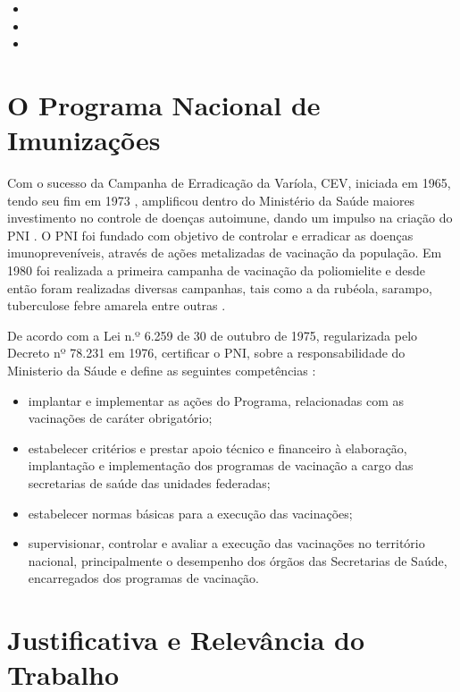 \begin{itemize}
  \item {}
  \item {}
  \item {}
\end{itemize}

\section{O Programa Nacional de Imunizações}
\label{intro:justificativa}

Com o sucesso da Campanha de Erradicação da Varíola, CEV, iniciada em 1965, tendo seu fim em 1973 \cite{muniz2011memorias}, amplificou dentro do Ministério da Saúde maiores investimento no controle de doenças autoimune, dando um impulso na criação do PNI \cite{temporao2003programa}. O PNI foi fundado com objetivo de controlar e erradicar as doenças imunopreveníveis, através de ações metalizadas de vacinação da população. Em 1980 foi realizada a primeira campanha de vacinação da poliomielite e desde então foram realizadas diversas campanhas, tais como a da rubéola, sarampo, tuberculose febre amarela entre outras \cite{temporao2003programa,ministerio2001manual}.

De acordo com a Lei n.º 6.259 de 30 de outubro de 1975, regularizada pelo Decreto nº 78.231 em 1976, certificar o PNI, sobre a responsabilidade do Ministerio da Sáude e define as seguintes competências \cite{ministerio2001manual}:
  \begin{itemize}
    \item implantar e implementar as ações do Programa, relacionadas com as vacinações de caráter obrigatório;
    \item  estabelecer critérios e prestar apoio técnico e financeiro à elaboração, implantação e implementação dos programas de vacinação a cargo das secretarias de saúde das unidades federadas;
    \item estabelecer normas básicas para a execução das vacinações;
    \item supervisionar, controlar e avaliar a execução das vacinações no território nacional, principalmente o desempenho dos órgãos das Secretarias de Saúde, encarregados dos programas de vacinação.
  \end{itemize}
\section{Justificativa e Relevância do Trabalho}
\label{intro:justificativa}



